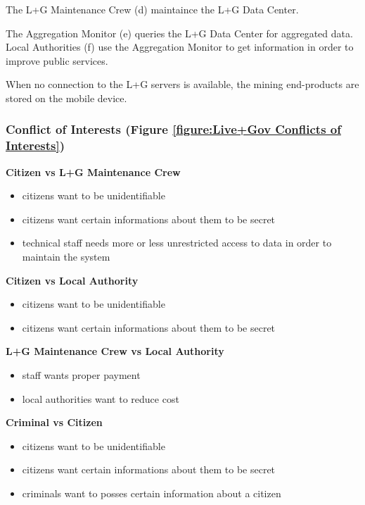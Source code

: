 The L+G Maintenance Crew (d) maintaince the L+G Data Center.

The Aggregation Monitor (e) queries the L+G Data Center for aggregated
data. Local Authorities (f) use the Aggregation Monitor to get
information in order to improve public services.

When no connection to the L+G servers is available, the mining
end-products are stored on the mobile device.

\subsubsection{Conflict of Interests (Figure \ref{figure:Live+Gov Conflicts of Interests})}



\textbf{Citizen vs L+G Maintenance Crew}

\begin{itemize}
\itemsep1pt\parskip0pt
\item
  citizens want to be unidentifiable
\item
  citizens want certain informations about them to be secret
\item
  technical staff needs more or less unrestricted access to data in
  order to maintain the system
\end{itemize}

\textbf{Citizen vs Local Authority}

\begin{itemize}
\itemsep1pt\parskip0pt
\item
  citizens want to be unidentifiable
\item
  citizens want certain informations about them to be secret
\end{itemize}

\textbf{L+G Maintenance Crew vs Local Authority}

\begin{itemize}
\itemsep1pt\parskip0pt
\item
  staff wants proper payment
\item
  local authorities want to reduce cost
\end{itemize}

\textbf{Criminal vs Citizen}

\begin{itemize}
\itemsep1pt\parskip0pt
\item
  citizens want to be unidentifiable
\item
  citizens want certain informations about them to be secret
\item
  criminals want to posses certain information about a citizen
\end{itemize}

